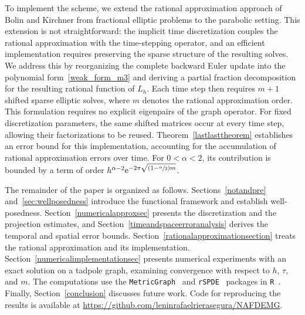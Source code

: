\documentclass[numbers,webpdf]{ima-authoring-template}%
\theoremstyle{thmstyletwo}%
\numberwithin{equation}{section}
\begin{document}
To implement the scheme, we extend the rational approximation approach of Bolin and Kirchner \cite{bolin2020rationalapprox} from fractional elliptic problems to the parabolic setting. This extension is not straightforward: the implicit time discretization couples the rational approximation with the time-stepping operator, and an efficient implementation requires preserving the sparse structure of the resulting solves. We address this by reorganizing the complete backward Euler update into the polynomial form~\eqref{weak_form_m3} and deriving a partial fraction decomposition for the resulting rational function of $L_h$. Each time step then requires $m+1$ shifted sparse elliptic solves, where $m$ denotes the rational approximation order. This formulation requires no explicit eigenpairs of the graph operator. For fixed discretization parameters, the same shifted matrices occur at every time step, allowing their factorizations to be reused. Theorem~\ref{lastlasttheorem} establishes an error bound for this implementation, accounting for the accumulation of rational approximation errors over time. For $0<\alpha<2$, its contribution is bounded by a term of order $h^{\alpha-2}\mathrm{e}^{-2\pi\sqrt{(1-\sfrac{\alpha}{2})m}}$.

The remainder of the paper is organized as follows. Sections~\ref{notandpre} and~\ref{sec:wellposedness} introduce the functional framework and establish well-posedness. Section~\ref{numericalapproxsec} presents the discretization and the projection estimates, and Section~\ref{timeandspaceerroranalysis} derives the temporal and spatial error bounds. Section~\ref{rationalapproximationsection} treats the rational approximation and its implementation. Section~\ref{numericalimplementationsec} presents numerical experiments with an exact solution on a tadpole graph, examining convergence with respect to $h$, $\tau$, and $m$. The computations use the \texttt{MetricGraph}~\cite{MetricGraphRpackage} and \texttt{rSPDE}~\cite{rSPDERpackage} packages in \texttt{R}~\cite{Rsoftware}. Finally, Section~\ref{conclusion} discusses future work. Code for reproducing the results is available at \url{https://github.com/leninrafaelrierasegura/NAFDEMG}.
\end{document}
